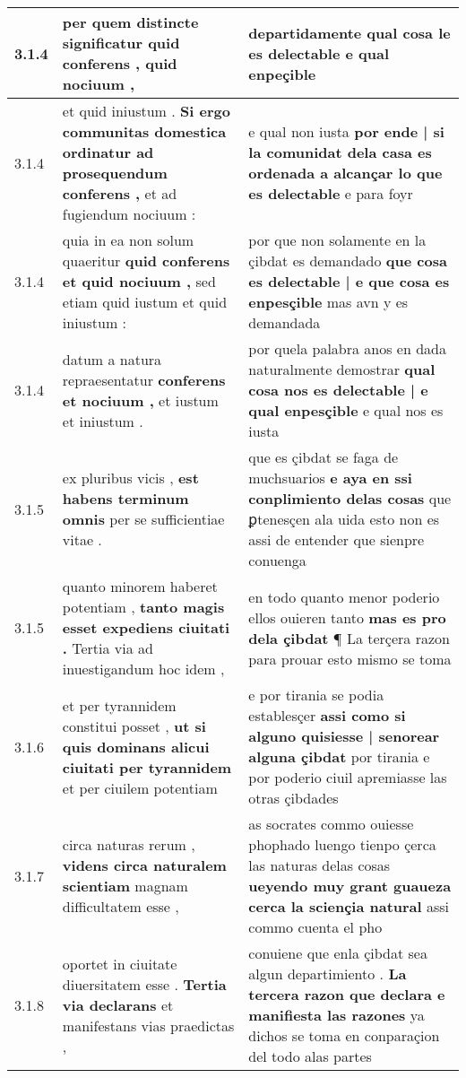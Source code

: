 \begin{tabular}{|p{1cm}|p{6.5cm}|p{6.5cm}|}
3.1.4 & per quem distincte significatur \textbf{ quid conferens , } quid nociuum , & departidamente \textbf{ qual cosa le es delectable } e qual enpeçible \\\hline
3.1.4 & et quid iniustum . \textbf{ Si ergo communitas domestica ordinatur ad prosequendum conferens , } et ad fugiendum nociuum : & e qual non iusta \textbf{ por ende | si la comunidat dela casa es ordenada a alcançar lo que es delectable } e para foyr \\\hline
3.1.4 & quia in ea non solum quaeritur \textbf{ quid conferens et quid nociuum , } sed etiam quid iustum et quid iniustum : & por que non solamente en la çibdat es demandado \textbf{ que cosa es delectable | e que cosa es enpesçible } mas avn y es demandada \\\hline
3.1.4 & datum a natura repraesentatur \textbf{ conferens et nociuum , } et iustum et iniustum . & por quela palabra anos en dada naturalmente demostrar \textbf{ qual cosa nos es delectable | e qual enpesçible } e qual nos es iusta \\\hline
3.1.5 & ex pluribus vicis , \textbf{ est habens terminum omnis } per se sufficientiae vitae . & que es çibdat se faga de muchsuarios \textbf{ e aya en ssi conplimiento delas cosas } que ꝑtenesçen ala uida esto non es assi de entender que sienpre conuenga \\\hline
3.1.5 & quanto minorem haberet potentiam , \textbf{ tanto magis esset expediens ciuitati . } Tertia via ad inuestigandum hoc idem , & en todo quanto menor poderio ellos ouieren tanto \textbf{ mas es pro dela çibdat } ¶ La terçera razon para prouar esto mismo se toma \\\hline
3.1.6 & et per tyrannidem constitui posset , \textbf{ ut si quis dominans alicui ciuitati per tyrannidem } et per ciuilem potentiam & e por tirania se podia establesçer \textbf{ assi como si alguno quisiesse | senorear alguna çibdat } por tirania e por poderio ciuil apremiasse las otras çibdades \\\hline
3.1.7 & circa naturas rerum , \textbf{ videns circa naturalem scientiam } magnam difficultatem esse , & as socrates commo ouiesse phophado luengo tienpo çerca las naturas delas cosas \textbf{ ueyendo muy grant guaueza cerca la sciençia natural } assi commo cuenta el pho \\\hline
3.1.8 & oportet in ciuitate diuersitatem esse . \textbf{ Tertia via declarans } et manifestans vias praedictas , & conuiene que enla çibdat sea algun departimiento . \textbf{ La tercera razon que declara e manifiesta las razones } ya dichos se toma en conparaçion del todo alas partes \\\hline

\end{tabular}
